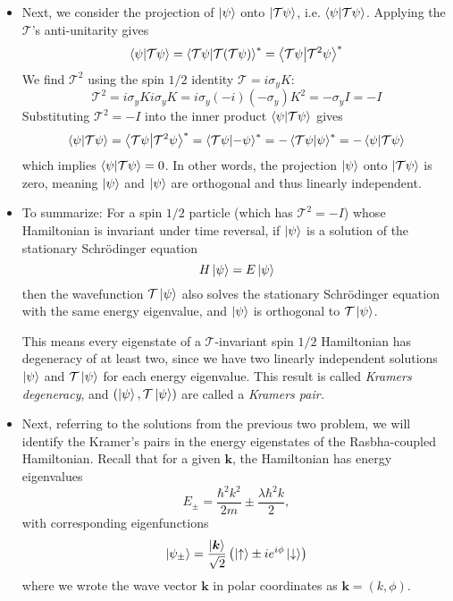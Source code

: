 \documentclass[11pt, a4paper]{article}
\newcommand{\schro}{Schr\"{o}dinger\xspace}
\newcommand{\Ham}{Hamiltonian\xspace}
\renewcommand{\vec}[1]{\bm{#1}} %
\newcommand{\ua}{\uparrow}  %
\newcommand{\da}{\downarrow}  %
\renewcommand{\k}{\vec{k}}  %
\newcommand{\T}{\mathcal{T}}  %
\begin{document}
\begin{itemize}
	\item Next, we consider the projection of $ \ket{\psi} $ onto $ \ket{\T \psi} $, i.e. $ \braket{\psi}{\T\psi} $. Applying the $ \T $'s anti-unitarity gives
	\begin{equation*}
		\braket{\psi}{\T\psi} = \braket{\T\psi}{\T(\T\psi)}^{*} = \braket{\T\psi}{\T^{2}\psi}^{*}
	\end{equation*}
	We find $ \T^{2} $ using the spin $ 1/2 $ identity $ \T = i \sigma_{y}K $:
	\begin{equation*}
		\T^{2} = i \sigma_{y}K i\sigma_{y}K = i\sigma_{y}(-i)(-\sigma_{y})K^{2} = -\sigma_{y} I = - I
	\end{equation*}
	Substituting $ \T^{2} = - I $ into the inner product $ \braket{\psi}{\T\psi} $ gives
	\begin{equation*}
		\braket{\psi}{\T\psi} = \braket{\T\psi}{\T^{2}\psi}^{*} = \braket{\T\psi}{-\psi}^{*} = -\braket{\T\psi}{\psi}^{*} = - \braket{\psi}{\T\psi}
	\end{equation*}
	which implies $ \braket{\psi}{\T\psi} = 0 $. In other words, the projection  $ \ket{\psi} $ onto $ \ket{\T \psi} $ is zero, meaning $ \ket{\psi} $ and $ \ket{\psi} $ are orthogonal and thus linearly independent.
	
	
	\item To summarize: For a spin $ 1/2 $ particle (which has $ \T^{2} = -I $) whose Hamiltonian is invariant under time reversal, if $ \ket{\psi} $ is a solution of the stationary \schro equation
	\begin{equation*}
		H \ket{\psi} = E\ket{\psi}
	\end{equation*}
	then the wavefunction $ \T\ket{\psi} $ also solves the stationary \schro equation with the same energy eigenvalue, and $ \ket{\psi} $ is orthogonal to $ \T \ket{\psi} $. 
	
	This means every eigenstate of a $ \T $-invariant spin $ 1/2 $ Hamiltonian has degeneracy of at least two, since we have two linearly independent solutions $ \ket{\psi} $ and $ \T \ket{\psi} $ for each energy eigenvalue. This result is called \textit{Kramers degeneracy}, and $ (\ket{\psi}, \T\ket{\psi}) $ are called a \textit{Kramers pair. }

	\item Next, referring to the solutions from the previous two problem, we will identify the Kramer's pairs in the energy eigenstates of the Rasbha-coupled Hamiltonian. Recall that for a given $ \k $, the \Ham has energy eigenvalues
	\begin{equation*}
		E_{\pm} = \frac{\hbar^{2}k^{2}}{2m} \pm \frac{\lambda\hbar^{2}k}{2},
	\end{equation*}
	with corresponding eigenfunctions
	\begin{equation*}
		\ket{\psi_{\pm}} = \frac{\ket{\k}}{\sqrt{2}}\left(\ket{\ua} \pm ie^{i\phi}\ket{\da}\right)
	\end{equation*}
	where we wrote the wave vector $ \k $ in polar coordinates as $ \k = (k, \phi) $. 
	

\end{itemize}
\end{document}
